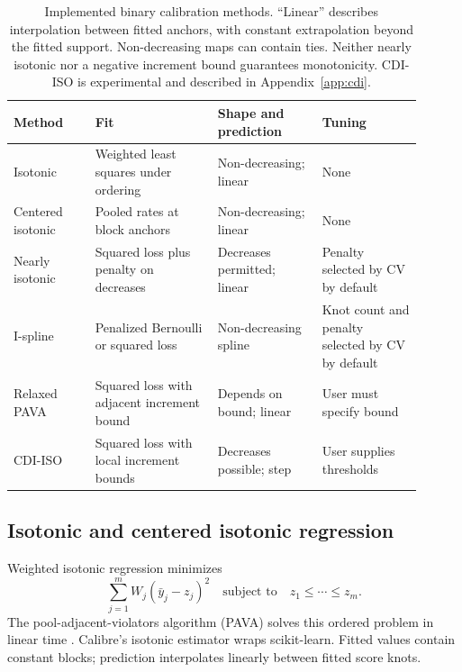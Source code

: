 \documentclass[11pt]{article}
\begin{document}
\begin{table}[htbp]
\centering\small
\setlength{\tabcolsep}{4pt}
\renewcommand{\arraystretch}{1.15}
\caption{Implemented binary calibration methods. ``Linear'' describes interpolation between fitted anchors, with constant extrapolation beyond the fitted support. Non-decreasing maps can contain ties. Neither nearly isotonic nor a negative increment bound guarantees monotonicity. CDI-ISO is experimental and described in Appendix~\ref{app:cdi}.}
\label{tab:methods}
\begin{tabular}{@{}>{\raggedright\arraybackslash}p{0.18\linewidth}>{\raggedright\arraybackslash}p{0.27\linewidth}>{\raggedright\arraybackslash}p{0.23\linewidth}>{\raggedright\arraybackslash}p{0.22\linewidth}@{}}
\toprule
Method & Fit & Shape and prediction & Tuning \\
\midrule
Isotonic & Weighted least squares under ordering & Non-decreasing; linear & None \\
Centered isotonic & Pooled rates at block anchors & Non-decreasing; linear & None \\
Nearly isotonic & Squared loss plus penalty on decreases & Decreases permitted; linear & Penalty selected by CV by default \\
I-spline & Penalized Bernoulli or squared loss & Non-decreasing spline & Knot count and penalty selected by CV by default \\
Relaxed PAVA & Squared loss with adjacent increment bound & Depends on bound; linear & User must specify bound \\
CDI-ISO & Squared loss with local increment bounds & Decreases possible; step & User supplies thresholds \\
\bottomrule
\end{tabular}
\end{table}

\subsection{Isotonic and centered isotonic regression}

Weighted isotonic regression minimizes
\begin{equation}
\sum_{j=1}^{m}W_j(\bar y_j-z_j)^2
\quad\text{subject to}\quad z_1\leq\cdots\leq z_m.
\label{eq:iso}
\end{equation}
The pool-adjacent-violators algorithm (PAVA) solves this ordered problem in linear time \citep{ayer1955empirical}. Calibre's isotonic estimator wraps scikit-learn. Fitted values contain constant blocks; prediction interpolates linearly between fitted score knots.
\end{document}
